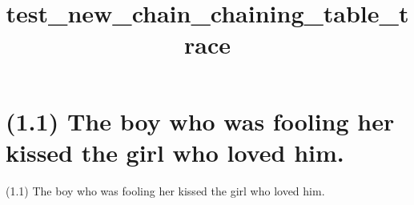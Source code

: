 \documentclass{article}
\begin{document}
%
%

\title{\textbf{test\_new\_chain\_chaining\_table\_trace}}
\maketitle

\clearpage

%
%

\section*{(1.1) The boy who was fooling her kissed the girl who loved him.}

\bigbreak
\begin{enumerate*}
\item[(1.1)] The boy who was fooling her kissed the girl who loved him.
\end{enumerate*}
\bigbreak

\bigbreak
\vbox{}
\bigbreak

\bigbreak
\begin{minipage}{\textwidth}
\end{minipage}
\bigbreak
\end{document}
